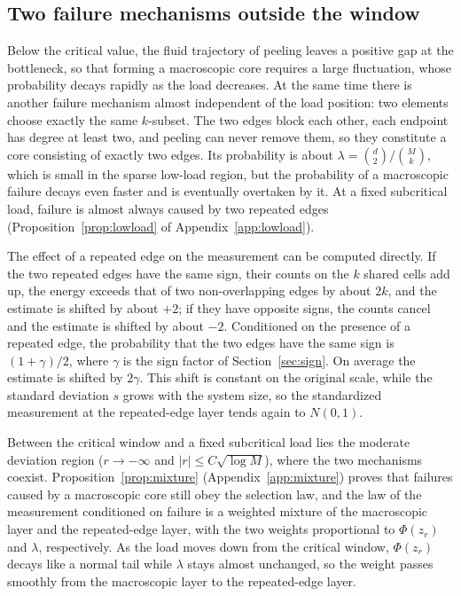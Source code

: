 \subsection{Two failure mechanisms outside the window}\label{sec:loadaxis}
Below the critical value, the fluid trajectory of peeling leaves a positive gap at the bottleneck, so that forming a
macroscopic core requires a large fluctuation, whose probability decays rapidly as the load decreases. At the same time
there is another failure mechanism almost independent of the load position: two elements choose exactly the same
$k$-subset. The two edges block each other, each endpoint has degree at least two, and peeling can never remove them,
so they constitute a core consisting of exactly two edges. Its probability is about $\lambda = \binom{d}{2}/\binom{M}{k}$,
which is small in the sparse low-load region, but the probability of a macroscopic failure decays even faster and is
eventually overtaken by it. At a fixed subcritical load, failure is almost always caused by two repeated edges
(Proposition~\ref{prop:lowload} of Appendix~\ref{app:lowload}).

The effect of a repeated edge on the measurement can be computed directly. If the two repeated edges have the same
sign, their counts on the $k$ shared cells add up, the energy exceeds that of two non-overlapping edges by about $2k$,
and the estimate is shifted by about $+2$; if they have opposite signs, the counts cancel and the estimate is shifted by
about $-2$. Conditioned on the presence of a repeated edge, the probability that the two edges have the same sign is
$(1+\gamma)/2$, where $\gamma$ is the sign factor of Section~\ref{sec:sign}. On average the estimate is shifted by
$2\gamma$. This shift is constant on the original scale, while the standard deviation $s$ grows with the system size, so
the standardized measurement at the repeated-edge layer tends again to $N(0,1)$.

Between the critical window and a fixed subcritical load lies the moderate deviation region ($r \to -\infty$ and
$|r| \le C\sqrt{\log M}$), where the two mechanisms coexist. Proposition~\ref{prop:mixture}
(Appendix~\ref{app:mixture}) proves that failures caused by a macroscopic core still obey the selection law, and the law
of the measurement conditioned on failure is a weighted mixture of the macroscopic layer and the repeated-edge layer,
with the two weights proportional to $\Phi(z_r)$ and $\lambda$, respectively. As the load moves down from the critical
window, $\Phi(z_r)$ decays like a normal tail while $\lambda$ stays almost unchanged, so the weight passes smoothly from
the macroscopic layer to the repeated-edge layer.

